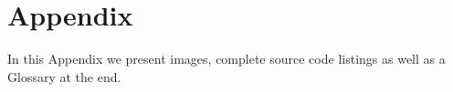 


\chapter{Appendix}
\label{chap:appendix}
In this Appendix we present images, complete source code listings as well as a Glossary at the end.
